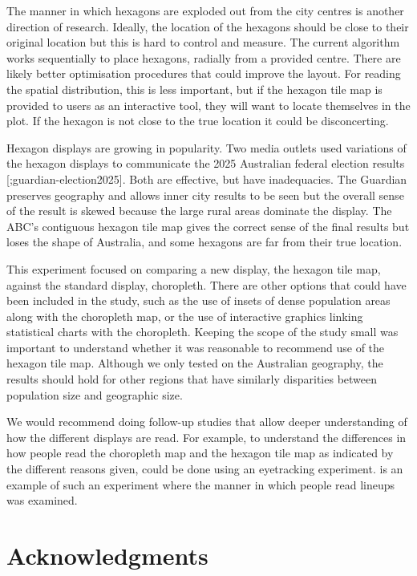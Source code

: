 \documentclass[
doublespace,
  times]{anzsauth}
\begin{document}
The manner in which hexagons are exploded out from the city centres is
another direction of research. Ideally, the location of the hexagons
should be close to their original location but this is hard to control
and measure. The current algorithm works sequentially to place hexagons,
radially from a provided centre. There are likely better optimisation
procedures that could improve the layout. For reading the spatial
distribution, this is less important, but if the hexagon tile map is
provided to users as an interactive tool, they will want to locate
themselves in the plot. If the hexagon is not close to the true location
it could be disconcerting.

Hexagon displays are growing in popularity. Two media outlets used
variations of the hexagon displays to communicate the 2025 Australian
federal election results
{[}\citet{abc-election2025};guardian-election2025{]}. Both are
effective, but have inadequacies. The Guardian preserves geography and
allows inner city results to be seen but the overall sense of the result
is skewed because the large rural areas dominate the display. The ABC's
contiguous hexagon tile map gives the correct sense of the final results
but loses the shape of Australia, and some hexagons are far from their
true location.

This experiment focused on comparing a new display, the hexagon tile
map, against the standard display, choropleth. There are other options
that could have been included in the study, such as the use of insets of
dense population areas along with the choropleth map, or the use of
interactive graphics linking statistical charts with the choropleth.
Keeping the scope of the study small was important to understand whether
it was reasonable to recommend use of the hexagon tile map. Although we
only tested on the Australian geography, the results should hold for
other regions that have similarly disparities between population size
and geographic size.

We would recommend doing follow-up studies that allow deeper
understanding of how the different displays are read. For example, to
understand the differences in how people read the choropleth map and the
hexagon tile map as indicated by the different reasons given, could be
done using an eyetracking experiment. \citet{ZCHMR} is an example of
such an experiment where the manner in which people read lineups was
examined.

\section*{Acknowledgments}\label{acknowledgments}
\end{document}
